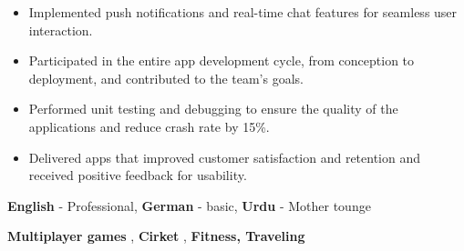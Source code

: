 \documentclass[9pt]{developercv}
\begin{document}
\begin{entrylist}
{\begin{itemize}[noitemsep,topsep=0pt,parsep=0pt,partopsep=0pt, leftmargin=-1pt]
            \item {Implemented push notifications and real-time chat features for seamless user interaction.}

            \item {Participated in the entire app development cycle, from conception to deployment, and contributed to the team’s goals.}

            \item {Performed unit testing and debugging to ensure the quality of the applications and reduce crash rate by 15\%.}

            \item {Delivered apps that improved customer satisfaction and retention and received positive feedback for usability.}

        \end{itemize}
    }

\end{entrylist}

\vspace{-10 pt}
\vspace{-6pt}

\hspace{26mm} \textbf{English} - Professional, \textbf{ German} - basic, \textbf{ Urdu} - Mother tounge



\vspace{-10 pt}
\vspace{-6pt}

\hspace{26mm} \textbf{Multiplayer games} , \textbf{ Cirket} , \textbf{ Fitness, Traveling}

\end{document}
